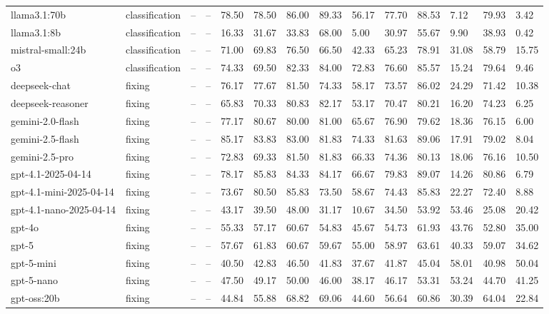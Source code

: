 \begin{table}[!t]
\begin{tabular}{llllllllllllll}
llama3.1:70b & classification & -- & -- & 78.50 & 78.50 & 86.00 & 89.33 & 56.17 & 77.70 & 88.53 & 7.12 & 79.93 & 3.42 \\
llama3.1:8b & classification & -- & -- & 16.33 & 31.67 & 33.83 & 68.00 & 5.00 & 30.97 & 55.67 & 9.90 & 38.93 & 0.42 \\
mistral-small:24b & classification & -- & -- & 71.00 & 69.83 & 76.50 & 66.50 & 42.33 & 65.23 & 78.91 & 31.08 & 58.79 & 15.75 \\
o3 & classification & -- & -- & 74.33 & 69.50 & 82.33 & 84.00 & 72.83 & 76.60 & 85.57 & 15.24 & 79.64 & 9.46 \\
deepseek-chat & fixing & -- & -- & 76.17 & 77.67 & 81.50 & 74.33 & 58.17 & 73.57 & 86.02 & 24.29 & 71.42 & 10.38 \\
deepseek-reasoner & fixing & -- & -- & 65.83 & 70.33 & 80.83 & 82.17 & 53.17 & 70.47 & 80.21 & 16.20 & 74.23 & 6.25 \\
gemini-2.0-flash & fixing & -- & -- & 77.17 & 80.67 & 80.00 & 81.00 & 65.67 & 76.90 & 79.62 & 18.36 & 76.15 & 6.00 \\
gemini-2.5-flash & fixing & -- & -- & 85.17 & 83.83 & 83.00 & 81.83 & 74.33 & 81.63 & 89.06 & 17.91 & 79.02 & 8.04 \\
gemini-2.5-pro & fixing & -- & -- & 72.83 & 69.33 & 81.50 & 81.83 & 66.33 & 74.36 & 80.13 & 18.06 & 76.16 & 10.50 \\
gpt-4.1-2025-04-14 & fixing & -- & -- & 78.17 & 85.83 & 84.33 & 84.17 & 66.67 & 79.83 & 89.07 & 14.26 & 80.86 & 6.79 \\
gpt-4.1-mini-2025-04-14 & fixing & -- & -- & 73.67 & 80.50 & 85.83 & 73.50 & 58.67 & 74.43 & 85.83 & 22.27 & 72.40 & 8.88 \\
gpt-4.1-nano-2025-04-14 & fixing & -- & -- & 43.17 & 39.50 & 48.00 & 31.17 & 10.67 & 34.50 & 53.92 & 53.46 & 25.08 & 20.42 \\
gpt-4o & fixing & -- & -- & 55.33 & 57.17 & 60.67 & 54.83 & 45.67 & 54.73 & 61.93 & 43.76 & 52.80 & 35.00 \\
gpt-5 & fixing & -- & -- & 57.67 & 61.83 & 60.67 & 59.67 & 55.00 & 58.97 & 63.61 & 40.33 & 59.07 & 34.62 \\
gpt-5-mini & fixing & -- & -- & 40.50 & 42.83 & 46.50 & 41.83 & 37.67 & 41.87 & 45.04 & 58.01 & 40.98 & 50.04 \\
gpt-5-nano & fixing & -- & -- & 47.50 & 49.17 & 50.00 & 46.00 & 38.17 & 46.17 & 53.31 & 53.24 & 44.70 & 41.25 \\
gpt-oss:20b & fixing & -- & -- & 44.84 & 55.88 & 68.82 & 69.06 & 44.60 & 56.64 & 60.86 & 30.39 & 64.04 & 22.84 \\

\end{tabular}
\end{table}
